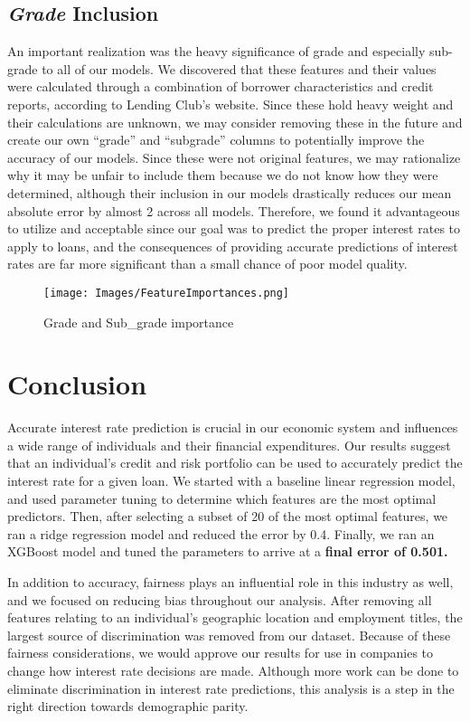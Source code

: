 \documentclass[twocolumn]{article}
\begin{document}
\subsection{\textit{Grade} Inclusion}
\par{\hspace{18}An important realization was the heavy significance of grade and especially sub-grade to all of our models. We discovered that these features and their values were calculated through a combination of borrower characteristics and credit reports, according to Lending Club's website. Since these hold heavy weight and their calculations are unknown, we may consider removing these in the future and create our own “grade” and “subgrade” columns to potentially improve the accuracy of our models. Since these were not original features, we may rationalize why it may be unfair to include them because we do not know how they were determined, although their inclusion in our models drastically reduces our mean absolute error by almost 2 across all models. Therefore, we found it advantageous to utilize and acceptable since our goal was to predict the proper interest rates to apply to loans, and the consequences of providing accurate predictions of interest rates are far more significant than a small chance of poor model quality.}

\begin{figure}[h!]
\centering
\caption{Grade and Sub_grade importance}
\texttt{[image: Images/FeatureImportances.png]}
\end{figure}


\newpage

\section{Conclusion}
\par{\hspace{18}Accurate interest rate prediction is crucial in our economic system and influences a wide range of individuals and their financial expenditures. Our results suggest that an individual’s credit and risk portfolio can be used to accurately predict the interest rate for a given loan. We started with a baseline linear regression model, and used parameter tuning to determine which features are the most optimal predictors. Then, after selecting a subset of  20 of the most optimal features, we ran a ridge regression model and reduced the error by 0.4. Finally, we ran an XGBoost model and tuned the parameters to arrive at a \textbf{final error of 0.501.}
\par{\hspace{18}In addition to accuracy, fairness plays an influential role in this industry as well, and we focused on reducing bias throughout our analysis. After removing all features relating to an individual’s geographic location and employment titles, the largest source of discrimination was removed from our dataset. Because of these fairness considerations, we would approve our results for use in companies to change how interest rate decisions are made. Although more work can be done to eliminate discrimination in interest rate predictions, this analysis is a step in the right direction towards demographic parity. }
}
\end{document}
